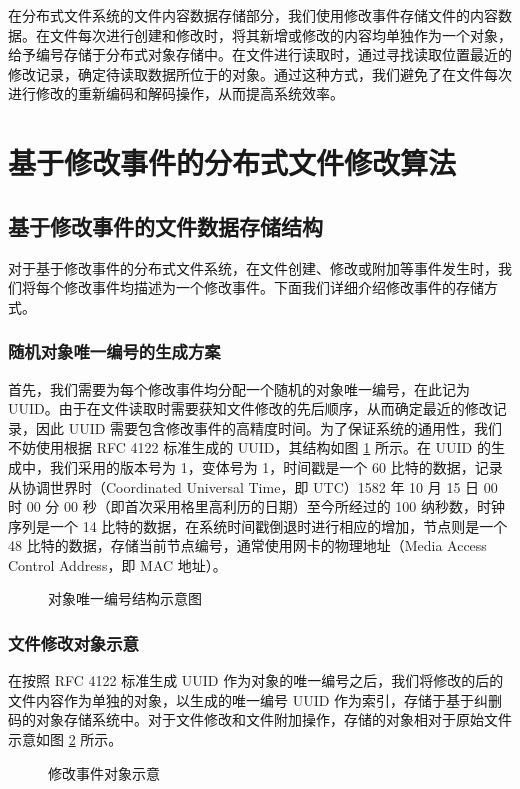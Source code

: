 在分布式文件系统的文件内容数据存储部分，我们使用修改事件存储文件的内容数据。在文件每次进行创建和修改时，将其新增或修改的内容均单独作为一个对象，给予编号存储于分布式对象存储中。在文件进行读取时，通过寻找读取位置最近的修改记录，确定待读取数据所位于的对象。通过这种方式，我们避免了在文件每次进行修改的重新编码和解码操作，从而提高系统效率。
\section{基于修改事件的分布式文件修改算法}
\subsection{基于修改事件的文件数据存储结构}
对于基于修改事件的分布式文件系统，在文件创建、修改或附加等事件发生时，我们将每个修改事件均描述为一个修改事件。下面我们详细介绍修改事件的存储方式。
\subsubsection{随机对象唯一编号的生成方案}
首先，我们需要为每个修改事件均分配一个随机的对象唯一编号，在此记为 UUID。由于在文件读取时需要获知文件修改的先后顺序，从而确定最近的修改记录，因此 UUID 需要包含修改事件的高精度时间。为了保证系统的通用性，我们不妨使用根据 RFC 4122 标准生成的 UUID，其结构如图 \ref{p16} 所示。在 UUID 的生成中，我们采用的版本号为 1，变体号为 1，时间戳是一个 60 比特的数据，记录从协调世界时（Coordinated Universal Time，即 UTC）1582 年 10 月 15 日 00 时 00 分 00 秒（即首次采用格里高利历的日期）至今所经过的 100 纳秒数，时钟序列是一个 14 比特的数据，在系统时间戳倒退时进行相应的增加，节点则是一个 48 比特的数据，存储当前节点编号，通常使用网卡的物理地址（Media Access Control Address，即 MAC 地址）。

\begin{figure}[!htb]
\centering
\resizebox{.8\textwidth}{!}{}
\caption{对象唯一编号结构示意图}
\label{p16}
\end{figure}
\subsubsection{文件修改对象示意}
在按照 RFC 4122 标准生成 UUID 作为对象的唯一编号之后，我们将修改的后的文件内容作为单独的对象，以生成的唯一编号 UUID 作为索引，存储于基于纠删码的对象存储系统中。对于文件修改和文件附加操作，存储的对象相对于原始文件示意如图 \ref{p4} 所示。

\begin{figure}[!htb]
\centering
\resizebox{.8\textwidth}{!}{}
\caption{修改事件对象示意}
\label{p4}
\end{figure}
